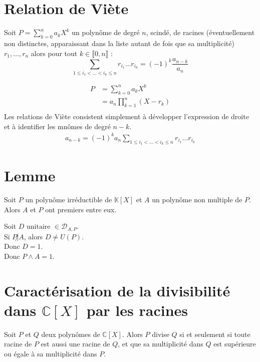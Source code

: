 \documentclass[../main.tex]{subfiles}
\begin{document}
\section{Relation de Viète}
\begin{tcolorbox}[title=Théorème 16.76, title filled=false, colframe=orange, colback=orange!10!white]
    Soit $P = \sum\limits_{k=0}^{n} a_k X^k$ un polynôme de degré $n$, scindé, de racines (éventuellement non distinctes, apparaissant dans la liste autant de fois que sa multiplicité) $r_1, \ldots, r_n$ alors pour tout $k \in \llbracket 0, n \rrbracket$ :
    $$\sum_{1 \leq i_1 < \ldots < i_k \leq n} r_{i_1} \ldots r_{i_k} = (-1)^k \frac{a_{n-k}}{a_n}$$
\end{tcolorbox}

\begin{align*}
    P &= \sum_{k=0}^{n} a_k X^k \\
    &= a_n \prod_{k=1}^{n} (X - r_k) \\
\end{align*}
Les relations de Viète consistent simplement à développer l'expression de droite et à identifier les mnômes de degré $n-k$.
\begin{align*}
    a_{n-k} = (-1)^k a_n \sum_{1 \leq i_1 < \ldots < i_k \leq n} r_{i_1} \ldots r_{i_k}
\end{align*}

\section{Lemme}
\begin{tcolorbox}[title=Lemme 16.88, title filled=false, colframe=orange, colback=orange!10!white]
    Soit $P$ un polynôme irréductible de $\mathbb{K}[X]$ et $A$ un polynôme non multiple de $P$. Alors $A$ et $P$ ont premiers entre eux. 
\end{tcolorbox}

\noindent Soit $D \text{ unitaire } \in \mathcal{D}_{A, P}$.\\
Si $P \not | A$, alors $D \neq U(P)$. \\
Donc $D = 1$. \\
Donc $P \wedge A = 1$.

\section{Caractérisation de la divisibilité dans $\mathbb{C}[X]$ par les racines}
\begin{tcolorbox}[title=Théorème 16.98, title filled=false, colframe=orange, colback=orange!10!white]
    Soit $P$ et $Q$ deux polynômes de $\mathbb{C}[X]$. Alors $P$ divise $Q$ si et seulement si toute racine de $P$ est aussi une racine de $Q$, et que sa multiplicité dans $Q$ est supérieure ou  égale à sa multiplicité dans $P$.
\end{tcolorbox}
\end{document}
